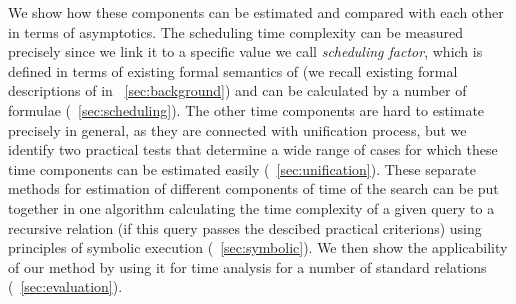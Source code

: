 We show how these components can be estimated and compared with each other in terms of asymptotics. The scheduling time complexity can be measured precisely since we link it to a specific value we call \emph{scheduling factor}, which is defined in terms of existing formal semantics of \mK (we recall existing formal descriptions of \mK in \sectionword~\ref{sec:background}) and can be calculated by a number of formulae  (\sectionword~\ref{sec:scheduling}). The other time components are hard to estimate precisely in general, as they are connected with unification process, but we identify two practical tests that determine a wide range of cases for which these time components can be estimated easily (\sectionword~\ref{sec:unification}). These separate methods for estimation of different components of time of the search can be put together in one algorithm calculating the time complexity of a given query to a recursive relation (if this query passes the descibed practical criterions) using principles of symbolic execution (\sectionword~\ref{sec:symbolic}). We then show the applicability of our method by using it for time analysis for a number of standard \mK relations (\sectionword~\ref{sec:evaluation}).
